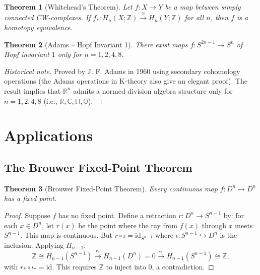 \documentclass[12pt,a4paper]{amsart}
\newtheorem{theorem}{Theorem}[section]
\theoremstyle{definition}
\begin{document}
\begin{theorem}[Whitehead's Theorem]
Let $f\colon X \to Y$ be a map between simply connected CW-complexes.
If $f_*\colon H_n(X;\mathbb{Z}) \xrightarrow{\cong} H_n(Y;\mathbb{Z})$
for all $n$, then $f$ is a homotopy equivalence.
\end{theorem}

\begin{theorem}[Adams -- Hopf Invariant 1]
\label{thm:adams}
There exist maps $f\colon S^{2n-1} \to S^n$ of Hopf invariant $1$ only for
$n = 1, 2, 4, 8$.
\end{theorem}
\begin{proof}[Historical note]
Proved by J. F. Adams in 1960 using secondary cohomology operations (the
Adams operations in K-theory also give an elegant proof). The result implies
that $\mathbb{R}^n$ admits a normed division algebra structure only for
$n = 1, 2, 4, 8$ (i.e., $\mathbb{R}, \mathbb{C}, \mathbb{H}, \mathbb{O}$).
\end{proof}

\section{Applications}
\label{sec:applications}

\subsection{The Brouwer Fixed-Point Theorem}

\begin{theorem}[Brouwer Fixed-Point Theorem]
\label{thm:brouwer}
Every continuous map $f\colon D^n \to D^n$ has a fixed point.
\end{theorem}
\begin{proof}
Suppose $f$ has no fixed point. Define a retraction
$r\colon D^n \to S^{n-1}$ by: for each $x \in D^n$, let $r(x)$ be the point
where the ray from $f(x)$ through $x$ meets $S^{n-1}$. This map is continuous.
But $r \circ \iota = \mathrm{id}_{S^{n-1}}$ where $\iota\colon S^{n-1} \hookrightarrow D^n$
is the inclusion. Applying $H_{n-1}$:
\[
  \mathbb{Z} \cong H_{n-1}(S^{n-1})
  \xrightarrow{r_*} H_{n-1}(D^n) = 0
  \xrightarrow{\iota_*} H_{n-1}(S^{n-1}) \cong \mathbb{Z},
\]
with $r_* \circ \iota_* = \mathrm{id}$. This requires $\mathbb{Z}$ to
inject into $0$, a contradiction.
\end{proof}
\end{document}
